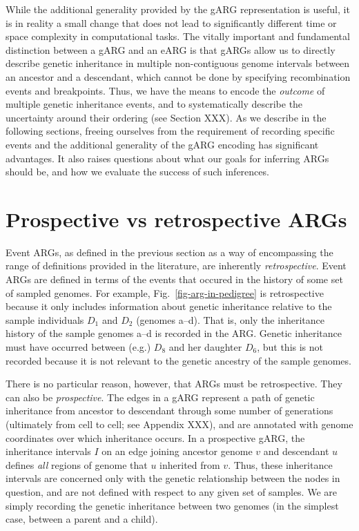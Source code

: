 \documentclass{article}
\newcommand{\noderef}[1]{\textsf{#1}}
\begin{document}
While the additional generality provided by the gARG representation
is useful, it is in reality a small change that does not
lead to significantly different time or space complexity in computational
tasks.
The vitally important and fundamental distinction between
a gARG and an eARG is that gARGs
allow us to directly describe
genetic inheritance in multiple non-contiguous genome intervals
between an ancestor and a descendant, which cannot be done
by specifying recombination events and breakpoints.
Thus, we have the means to encode the \emph{outcome} of
multiple genetic inheritance events, and to
systematically describe the uncertainty around their
ordering (see Section XXX).
As we describe in the following sections, freeing ourselves from the requirement
of recording specific events and
the additional generality of the gARG encoding
has significant advantages. It also raises questions about what our goals
for inferring ARGs should be, and how we evaluate the success
of such inferences.

\section*{Prospective vs retrospective ARGs}
Event ARGs, as defined in the previous section as a way of encompassing
the range of definitions provided in the literature, are
inherently \emph{retrospective}.
Event ARGs are defined in terms
of the events that occured in the history of some set of sampled
genomes.
For example, Fig.~\ref{fig-arg-in-pedigree}
is retrospective because it only includes information
about genetic inheritance relative to the sample individuals
$D_1$ and $D_2$ (genomes \noderef{a}--\noderef{d}).
That is, only the inheritance
history of the sample genomes \noderef{a}--\noderef{d} is recorded in the ARG.
Genetic inheritance must have occurred between (e.g.)
$D_8$ and her daughter $D_6$, but this is not recorded because
it is not relevant to the genetic ancestry of the sample genomes.

There is no particular reason, however, that ARGs must be
retrospective. They can also be \emph{prospective}.
The edges in a gARG represent a path of genetic inheritance from
ancestor to descendant through some
number of generations (ultimately from cell to cell; see Appendix XXX),
and are annotated
with genome coordinates over which inheritance occurs.
In a prospective gARG, the inheritance intervals $I$
on an edge joining ancestor genome $v$ and descendant $u$
defines \emph{all} regions of genome that $u$ inherited from $v$.
Thus, these inheritance intervals are
concerned only with the genetic relationship
between the nodes in question, and are not defined with respect
to any given set of samples. We are simply recording the
genetic inheritance between two genomes
(in the simplest case, between a parent and a child).
\end{document}

